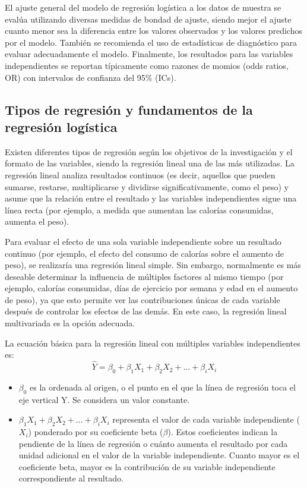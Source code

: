 El ajuste general del modelo de regresión logística a los datos de muestra se evalúa utilizando diversas medidas de bondad de ajuste, siendo mejor el ajuste cuanto menor sea la diferencia entre los valores observados y los valores predichos por el modelo. También se recomienda el uso de estadísticas de diagnóstico para evaluar adecuadamente el modelo. Finalmente, los resultados para las variables independientes se reportan típicamente como razones de momios (odds ratios, OR) con intervalos de confianza del 95\% (ICs).

\subsection{Tipos de regresión y fundamentos de la regresión logística}

Existen diferentes tipos de regresión según los objetivos de la investigación y el formato de las variables, siendo la regresión lineal una de las más utilizadas. La regresión lineal analiza resultados continuos (es decir, aquellos que pueden sumarse, restarse, multiplicarse y dividirse significativamente, como el peso) y asume que la relación entre el resultado y las variables independientes sigue una línea recta (por ejemplo, a medida que aumentan las calorías consumidas, aumenta el peso).

Para evaluar el efecto de una sola variable independiente sobre un resultado continuo (por ejemplo, el efecto del consumo de calorías sobre el aumento de peso), se realizaría una regresión lineal simple. Sin embargo, normalmente es más deseable determinar la influencia de múltiples factores al mismo tiempo (por ejemplo, calorías consumidas, días de ejercicio por semana y edad en el aumento de peso), ya que esto permite ver las contribuciones únicas de cada variable después de controlar los efectos de las demás. En este caso, la regresión lineal multivariada es la opción adecuada.

La ecuación básica para la regresión lineal con múltiples variables independientes es:
\begin{equation}
\hat{Y} = \beta_0 + \beta_1 X_1 + \beta_2 X_2 + \ldots + \beta_i X_i
\end{equation}

\begin{itemize}
    \item $\beta_0$ es la ordenada al origen, o el punto en el que la línea de regresión toca el eje vertical Y. Se considera un valor constante.
    \item $\beta_1 X_1 + \beta_2 X_2 + \ldots + \beta_i X_i$ representa el valor de cada variable independiente ($X_i$) ponderado por su coeficiente beta ($\beta$). Estos coeficientes indican la pendiente de la línea de regresión o cuánto aumenta el resultado por cada unidad adicional en el valor de la variable independiente. Cuanto mayor es el coeficiente beta, mayor es la contribución de su variable independiente correspondiente al resultado.
\end{itemize}

